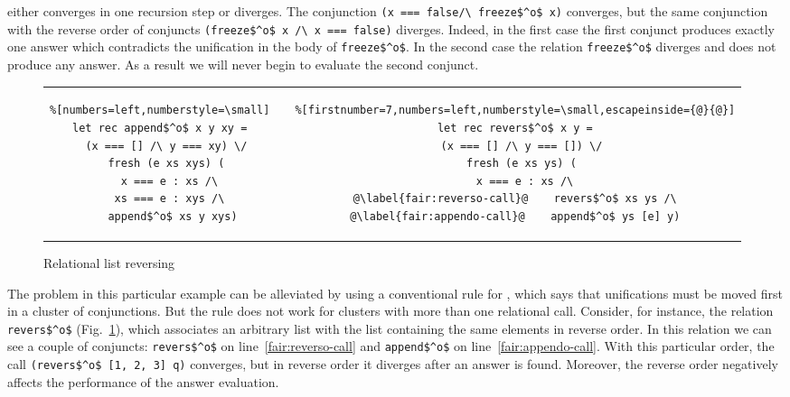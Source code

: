 \noindent either converges in one recursion step or diverges. The conjunction \lstinline{(x === false/\ freeze$^o$ x)} converges, but the same conjunction with the reverse order of conjuncts
\lstinline{(freeze$^o$ x /\ x === false)} diverges. Indeed, in the first case the first conjunct produces exactly one answer which contradicts the unification in the body
of \lstinline{freeze$^o$}. In the second case the relation \lstinline{freeze$^o$} diverges and does not produce any answer. As a result we will never begin to evaluate the second conjunct.

\begin{figure}[h!]
\centering
\begin{tabular}{cp{3cm}c}
\begin{lstlisting}%[numbers=left,numberstyle=\small]
let rec append$^o$ x y xy =
  (x === [] /\ y === xy) \/
  fresh (e xs xys) (
    x === e : xs /\ 
    xs === e : xys /\ 
    append$^o$ xs y xys)
\end{lstlisting}
& &
\begin{lstlisting}%[firstnumber=7,numbers=left,numberstyle=\small,escapeinside={@}{@}]
let rec revers$^o$ x y =
  (x === [] /\ y === []) \/
  fresh (e xs ys) (
    x === e : xs /\ 
@\label{fair:reverso-call}@    revers$^o$ xs ys /\
@\label{fair:appendo-call}@    append$^o$ ys [e] y)
\end{lstlisting}
\end{tabular}

\caption{Relational list reversing}
\label{fair:lst-reverso}
\end{figure}

The problem in this particular example can be alleviated by using a conventional rule for \mk, which says that unifications must be moved first in a cluster of conjunctions.
But the rule does not work for clusters with more than one relational call. Consider, for instance, the relation \lstinline{revers$^o$} (Fig.~\ref{fair:lst-reverso}), which associates
an arbitrary list with the list containing the same elements in reverse order. In this relation we can see a couple of conjuncts: \lstinline{revers$^o$} on line~\ref{fair:reverso-call} and
\lstinline{append$^o$} on line~\ref{fair:appendo-call}. With this particular order, the call \lstinline{(revers$^o$ [1, 2, 3] q)} converges, but in reverse order it diverges after an answer
is found. Moreover, the reverse order negatively affects the performance of the answer evaluation.

